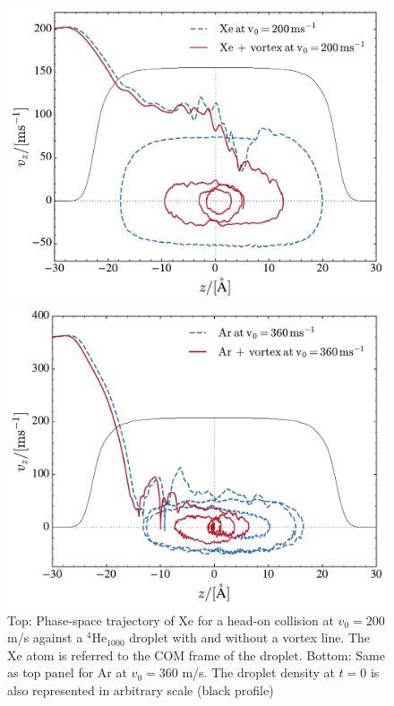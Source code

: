 \begin{figure}[!]
\centerline{\includegraphics[width=0.9\linewidth,clip]{phase-Xe-200-vortex}}
\centerline{\includegraphics[width=0.9\linewidth,clip]{phase-Ar-360-vortex}}
\caption{\label{fig3-capture} 
Top: Phase-space trajectory  of Xe  for a  head-on collision at $v_0= 200$  m/s against a $^4$He$_{1000}$ droplet with and without a vortex line. 
The Xe atom is referred to the COM frame of the droplet.
Bottom: Same as top panel for Ar at $v_0=360$ m/s.
The droplet  density at $t=0$ is also represented in arbitrary scale (black profile) 
}
\end{figure}
%

